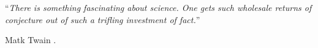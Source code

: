 %
%

\chapter*{}
\begin{SingleSpace}
\vspace*{0.2\textheight}

\noindent\enquote{\itshape There is something fascinating about science. One gets such wholesale returns of conjecture out of such a trifling investment of fact.}\bigbreak

\hfill Matk Twain
.
\end{SingleSpace}
\clearpage